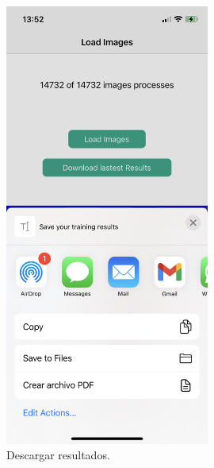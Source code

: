 \documentclass[../main.tex]{subfiles}
\begin{document}
    \begin{figure}[h]
    \centering 
    \includegraphics[width=0.6\textwidth]{images/trainingapp/trainingapp3.PNG}
    \caption{Descargar resultados.}
    \label{figure8}
    \end{figure}
    
\end{document}
